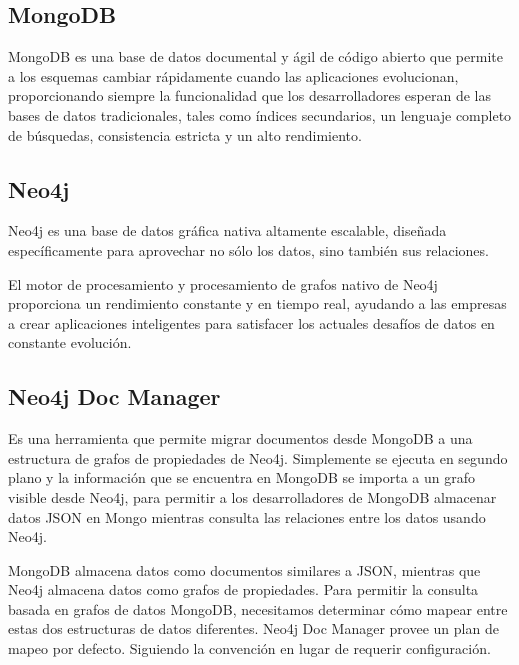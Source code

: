 \documentclass[conference]{IEEEtran}
\begin{document}
\subsection{MongoDB}
MongoDB es una base de datos documental y \'agil de c\'odigo abierto que permite a los esquemas cambiar r\'apidamente cuando las aplicaciones evolucionan, proporcionando siempre la funcionalidad que los desarrolladores esperan de las bases de datos tradicionales, tales como \'indices secundarios, un lenguaje completo de b\'usquedas, consistencia estricta y un alto rendimiento.\cite{mongo}

\subsection{Neo4j}
Neo4j es una base de datos gr\'afica nativa altamente escalable, diseñada espec\'ificamente para aprovechar no s\'olo los datos, sino tambi\'en sus relaciones.

El motor de procesamiento y procesamiento de grafos nativo de Neo4j proporciona un rendimiento constante y en tiempo real, ayudando a las empresas a crear aplicaciones inteligentes para satisfacer los actuales desafíos de datos en constante evolución.\cite{neo}

\subsection{Neo4j Doc Manager}
Es una herramienta que permite migrar documentos desde MongoDB a una estructura de grafos de propiedades de Neo4j. Simplemente se ejecuta en segundo plano y la informaci\'on que se encuentra en MongoDB se importa a un grafo visible desde Neo4j, para permitir a los desarrolladores de MongoDB almacenar datos JSON en Mongo mientras consulta las relaciones entre los datos usando Neo4j.

MongoDB almacena datos como documentos similares a JSON, mientras que Neo4j almacena datos como grafos de propiedades. Para permitir la consulta basada en grafos de datos MongoDB, necesitamos determinar c\'omo mapear entre estas dos estructuras de datos diferentes. Neo4j Doc Manager provee un plan de mapeo por defecto. Siguiendo la convenci\'on en lugar de requerir configuraci\'on.\cite{doc}
\end{document}
